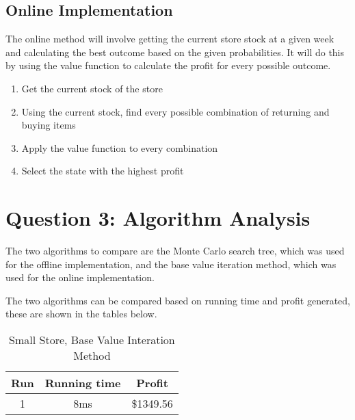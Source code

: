 \documentclass[12pt]{article}
\begin{document}
    \subsection{Online Implementation}

    The online method will involve getting the current store stock at a given week and calculating the best outcome based on the given probabilities. It will do this by using the value function to calculate the profit for every possible outcome.

    \begin{enumerate}
        \item Get the current stock of the store
        \item Using the current stock, find every possible combination of returning and buying items
        \item Apply the value function to every combination
        \item Select the state with the highest profit
    \end{enumerate}

    \section{Question 3: Algorithm Analysis}

    The two algorithms to compare are the Monte Carlo search tree, which was used for the offline implementation, and the base value iteration method, which was used for the online implementation.

    The two algorithms can be compared based on running time and profit generated, these are shown in the tables below.

    \begin{table}
        \centering
        \begin{tabular}{ |c|c|c| }
            \hline
            Run & Running time & Profit \\
            \hline
            1 & 8ms & \$1349.56\\
            \hline
        \end{tabular}

        \caption{Small Store, Base Value Interation Method}
    \end{table}
\end{document}
